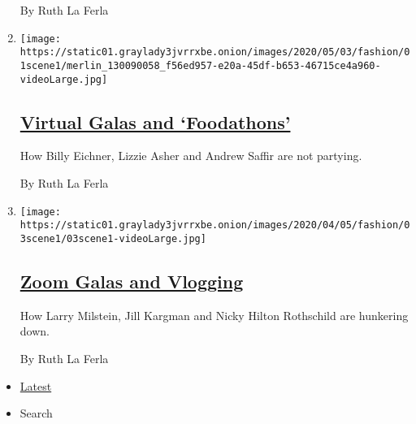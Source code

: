 \begin{enumerate}
  By Ruth La Ferla
\item
  \texttt{[image: https://static01.graylady3jvrrxbe.onion/images/2020/05/03/fashion/01scene1/merlin\_130090058\_f56ed957-e20a-45df-b653-46715ce4a960-videoLarge.jpg]}

  \hypertarget{virtual-galas-and-foodathons}{%
  \subsection{\texorpdfstring{\href{/2020/05/01/style/virtual-galas-and-foodathons.html}{Virtual
  Galas and
  `Foodathons'}}{Virtual Galas and `Foodathons'}}\label{virtual-galas-and-foodathons}}

  How Billy Eichner, Lizzie Asher and Andrew Saffir are not partying.

  By Ruth La Ferla
\item
  \texttt{[image: https://static01.graylady3jvrrxbe.onion/images/2020/04/05/fashion/03scene1/03scene1-videoLarge.jpg]}

  \hypertarget{zoom-galas-and-vlogging}{%
  \subsection{\texorpdfstring{\href{/2020/04/03/style/zoom-galas-and-vlogging.html}{Zoom
  Galas and
  Vlogging}}{Zoom Galas and Vlogging}}\label{zoom-galas-and-vlogging}}

  How Larry Milstein, Jill Kargman and Nicky Hilton Rothschild are
  hunkering down.

  By Ruth La Ferla
\end{enumerate}

\begin{itemize}
\tightlist
\item
  \protect\hyperlink{stream-panel}{Latest}
\item
  Search
\end{itemize}

